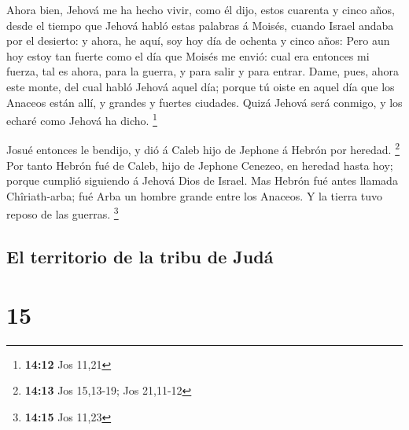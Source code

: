  Ahora bien, Jehová me ha hecho vivir, como él dijo, estos
cuarenta y cinco años, desde el tiempo que Jehová habló estas palabras á
Moisés, cuando Israel andaba por el desierto: y ahora, he aquí, soy hoy
día de ochenta y cinco años:  Pero aun hoy estoy tan fuerte
como el día que Moisés me envió: cual era entonces mi fuerza, tal es
ahora, para la guerra, y para salir y para entrar.  Dame,
pues, ahora este monte, del cual habló Jehová aquel día; porque tú oiste
en aquel día que los Anaceos están allí, y grandes y fuertes ciudades.
Quizá Jehová será conmigo, y los echaré como Jehová ha dicho.
\footnote{\textbf{14:12} Jos 11,21}

 Josué entonces le bendijo, y dió á Caleb hijo de Jephone á
Hebrón por heredad. \footnote{\textbf{14:13} Jos 15,13-19; Jos 21,11-12}
 Por tanto Hebrón fué de Caleb, hijo de Jephone Cenezeo, en
heredad hasta hoy; porque cumplió siguiendo á Jehová Dios de Israel.
 Mas Hebrón fué antes llamada Chîriath-arba; fué Arba un
hombre grande entre los Anaceos. Y la tierra tuvo reposo de las guerras.
\footnote{\textbf{14:15} Jos 11,23}

\hypertarget{el-territorio-de-la-tribu-de-juduxe1}{%
\subsection{El territorio de la tribu de
Judá}\label{el-territorio-de-la-tribu-de-juduxe1}}

\hypertarget{section-14}{%
\section{15}\label{section-14}}

